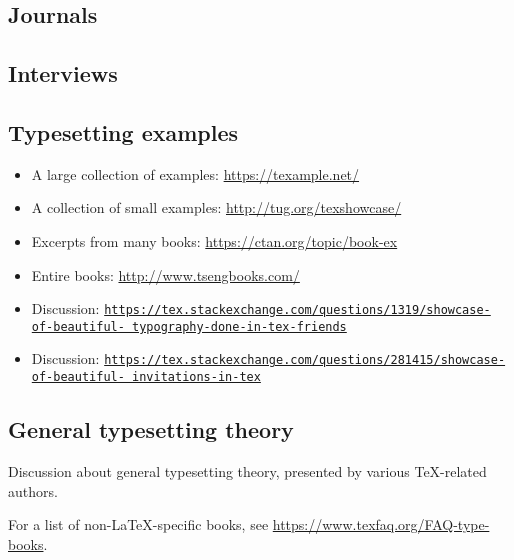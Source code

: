 \documentclass{article}
\def\\{ }%
\def\TeX{TeX}%
\def\LaTeX{LaTeX}%
\renewcommand*{\TeX}{TeX}
\renewcommand*{\LaTeX}{LaTeX}
\begin{document}
\subsection{Journals}

\printbibliography[
    heading=none,
    category=journals,
]


\subsection{Interviews}

\printbibliography[
    heading=none,
    category=interviews,
]


\subsection{Typesetting examples}

\begin{itemize}
\item A large collection of examples: \url{https://texample.net/}
\item A collection of small examples: \url{http://tug.org/texshowcase/}
\item Excerpts from many books: \url{https://ctan.org/topic/book-ex}
\item Entire books: \url{http://www.tsengbooks.com/}
\item Discussion: \href{https://tex.stackexchange.com/questions/1319/showcase-of-beautiful-typography-done-in-tex-friends}{\texttt{https://tex.stackexchange.com/questions/1319/showcase-of-beautiful-\\typography-done-in-tex-friends}}
\item Discussion: \href{https://tex.stackexchange.com/questions/281415/showcase-of-beautiful-invitations-in-tex}{\texttt{https://tex.stackexchange.com/questions/281415/showcase-of-beautiful-\\invitations-in-tex}}
\end{itemize}


\subsection{General typesetting theory}

Discussion about general typesetting theory,
presented by various \TeX-related authors.

For a list of non-\LaTeX-specific books, see \url{https://www.texfaq.org/FAQ-type-books}.

\printbibliography[
    heading=none,
    category=typesetting,
]
\end{document}
